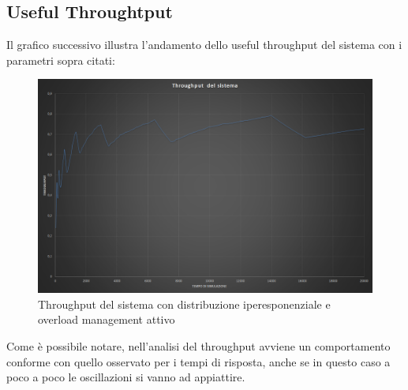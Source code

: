\subsection{Useful Throughtput}
Il grafico successivo illustra l'andamento dello useful throughput del sistema 
con i 
parametri sopra citati:
\begin{figure}[H]
 \centering
 \includegraphics[scale=0.45]{img/throughputOM.png}
 \caption[Throughput del sistema con distribuzione iperesponenziale e overload 
management attivo]{Throughput del sistema con distribuzione iperesponenziale e 
overload management attivo}
 \label{fig:Throughput del sistema con distribuzione iperesponenziale e overload 
management attivo}
\end{figure}
Come \`e possibile notare, nell'analisi del throughput avviene un comportamento 
conforme con quello osservato per i tempi di risposta, anche se in questo caso 
a poco a poco le oscillazioni si vanno ad appiattire.

